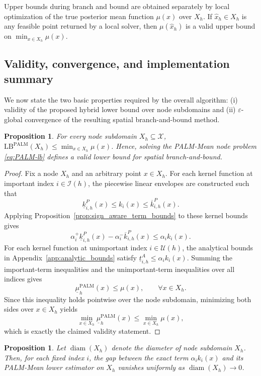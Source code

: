 \documentclass[pdflatex,sn-mathphys-num]{sn-jnl}%
\theoremstyle{thmstyleone}%
\newtheorem{proposition}[theorem]{Proposition}%
\theoremstyle{thmstyletwo}%
\theoremstyle{thmstylethree}%
\begin{document}
Upper bounds during branch and bound are obtained separately by local optimization of the true posterior mean function $\mu(x)$ over $X_h$. If $\hat{x}_h\in X_h$ is any feasible point returned by a local solver, then $\mu(\hat{x}_h)$ is a valid upper bound on $\min_{x\in X_h}\mu(x)$.

\subsection{Validity, convergence, and implementation summary}

We now state the two basic properties required by the overall algorithm: (i) validity of the proposed hybrid lower bound over node subdomains and (ii) $\varepsilon$-global convergence of the resulting spatial branch-and-bound method.

\begin{proposition}
\label{thm:PALM_validity}
For every node subdomain $X_h\subseteq\mathcal{X}$, $\mathrm{LB}^{\mathrm{PALM}}(X_h)\le \min_{x\in X_h}\mu(x)$.
Hence, solving the PALM-Mean node problem \eqref{eq:PALM-lb} defines a valid lower bound for spatial branch-and-bound.
\end{proposition}

\begin{proof}
Fix a node $X_h$ and an arbitrary point $x\in X_h$. For each kernel function at important index $i\in\mathcal{I}(h)$, the piecewise linear envelopes are constructed such that
\[
\underline{k}_{i,h}^{P}(x)\le k_i(x)\le \overline{k}_{i,h}^{P}(x).
\]
Applying Proposition~\ref{prop:sign_aware_term_bounds} to these kernel bounds gives
\[
\alpha_i^+\underline{k}_{i,h}^{P}(x)-\alpha_i^-\overline{k}_{i,h}^{P}(x)\le \alpha_i k_i(x).
\]
For each kernel function at unimportant index $i\in\mathcal{U}(h)$, the analytical bounds in Appendix~\ref{app:analytic_bounds} satisfy $\underline{t}_{i,h}^{A}\le \alpha_i k_i(x)$. Summing the important-term inequalities and the unimportant-term inequalities over all indices gives
\[
\underline{\mu}_h^{\mathrm{PALM}}(x)\le \mu(x),
\qquad \forall x\in X_h.
\]
Since this inequality holds pointwise over the node subdomain, minimizing both sides over $x\in X_h$ yields
\[
\min_{x\in X_h}\underline{\mu}_h^{\mathrm{PALM}}(x)
\le
\min_{x\in X_h}\mu(x),
\]
which is exactly the claimed validity statement.
\end{proof}

\begin{proposition}
\label{prop:hybrid_consistency}
Let $\operatorname{diam}(X_h)$ denote the diameter of node subdomain $X_h$. Then, for each fixed index $i$, the gap between the exact term $\alpha_i k_i(x)$ and its PALM-Mean lower estimator on $X_h$ vanishes uniformly as $\operatorname{diam}(X_h)\to0$.
\end{proposition}
\end{document}
